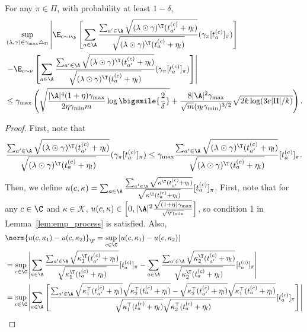\documentclass{article}
\newcommand{\mc}[1]{\mathcal{#1}}
\newcommand{\1}{\mathbf{1}}
\begin{document}
\begin{lemma}\label{lem:history_2}
For any $\pi\in\Pi$, with probability at least $1-\delta$, 
\begin{align*}
    &\sup_{(\lambda,\gamma)\in\gamma_{\max}\triangle_\Pi}\left|\E_{c\sim\nu_\D}\left[\sum_{a\in\A}\frac{\sum_{a'\in\A}\sqrt{(\lambda\odot\gamma)^\T (t_{a'}^{(c)}+\eta_l)}}{\sqrt{(\lambda\odot\gamma)^\T (t_{a}^{(c)}+\eta_l)}}(\gamma_\pi[t_a^{(c)}]_\pi)\right]\right.\\
    &\left.-\E_{c\sim\nu}\left[\sum_{a\in\A}\frac{\sum_{a'\in\A}\sqrt{(\lambda\odot\gamma)^\T (t_{a'}^{(c)}+\eta_l)}}{\sqrt{(\lambda\odot\gamma)^\T (t_{a}^{(c)}+\eta_l)}}(\gamma_\pi[t_a^{(c)}]_\pi)\right]\right|\\
    &\leq \gamma_{\max}\left(\sqrt{\frac{|\A|^4(1+\eta)\gamma_{\max}}{2\eta\gamma_{\min}m}\log\bigsmile{\frac{2}{\delta}}}+\frac{8|\A|^2\gamma_{\max}}{\sqrt{m}(\eta_l\gamma_{\min})^{3/2}}\sqrt{2k\log(3e|\Pi|/k)}\right).
\end{align*}
\begin{proof}
First, note that 
\[\frac{\sum_{a'\in\A}\sqrt{(\lambda\odot\gamma)^\T (t_{a'}^{(c)}+\eta_l)}}{\sqrt{(\lambda\odot\gamma)^\T (t_{a}^{(c)}+\eta_l)}}(\gamma_\pi[t_a^{(c)}]_\pi)\leq \gamma_{\max}\frac{\sum_{a'\in\A}\sqrt{(\lambda\odot\gamma)^\T (t_{a'}^{(c)}+\eta_l)}}{\sqrt{(\lambda\odot\gamma)^\T (t_{a}^{(c)}+\eta_l)}}[t_a^{(c)}]_\pi.\]
Then, we define $u(c,\kappa)=\sum_{a\in\A}\frac{\sum_{a'\in\A}\sqrt{\kappa^\T (t_{a'}^{(c)}+\eta_l)}}{\sqrt{\kappa^\T (t_{a}^{(c)}+\eta_l)}}[t_a^{(c)}]_\pi$. First, note that for any $c\in\C$ and $\kappa\in\mc{K}$, $u(c,\kappa)\in\Big[0,|\A|^2\frac{\sqrt{(1+\eta)\gamma_{\max}}}{\sqrt{\eta\gamma_{\min}}}\Big]$, so condition 1 in Lemma~\ref{lem:emp_process} is satisfied. Also, 
\begin{align}
    &\norm{u(c,\kappa_1)-u(c,\kappa_2)}_\F= \sup_{c\in\C}|u(c,\kappa_1)-u(c,\kappa_2)|\\
    &=\sup_{c\in\C}\left|\sum_{a\in\A}\frac{\sum_{a'\in\A}\sqrt{\kappa_1^\T(t_{a'}^{(c)}+\eta_l)}}{\sqrt{\kappa_1^\T(t_{a}^{(c)}+\eta_l)}}[t_a^{(c)}]_\pi-\sum_{a\in\A}\frac{\sum_{a'\in\A}\sqrt{\kappa_2^\T(t_{a'}^{(c)}+\eta_l)}}{\sqrt{\kappa_2^\T(t_{a}^{(c)}+\eta_l)}}[t_a^{(c)}]_\pi\right|\nonumber\\
    &= \sup_{c\in\C}\left|\sum_{a \in \A} \left[\frac{\sum_{a'\in\A}\sqrt{\kappa_1^{\top} (t_{a^{\prime}}^{(c)}+\eta_l)}\sqrt{\kappa_2^{\top} (t_{a}^{(c)}+\eta_l)}-\sqrt{\kappa_2^{\top} (t_{a'}^{(c)}+\eta_l)}\sqrt{\kappa_1^{\top} (t_{a}^{(c)}+\eta_l)}}{\sqrt{\kappa_1^{\top} (t_{a}^{(c)}+\eta_l)}\sqrt{\kappa_2^{\top} (t_{a}^{(c)}+\eta_l)}}[t_a^{(c)}]_\pi\right]\right|\nonumber\\

\end{align}
\end{proof}
\end{lemma}
\end{document}
